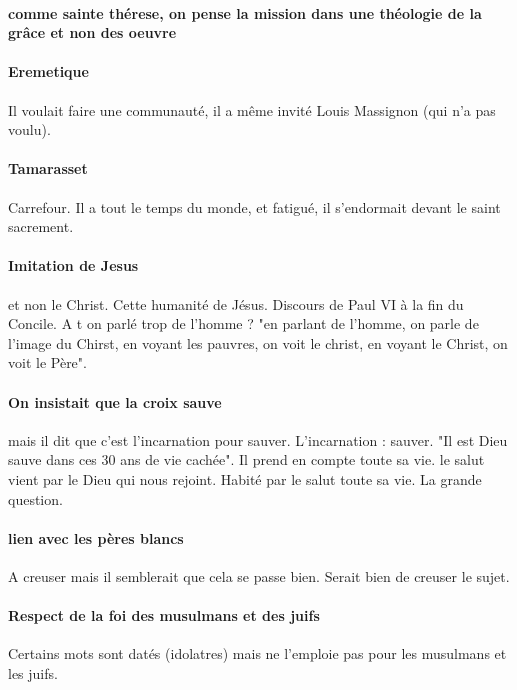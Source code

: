 \paragraph{comme sainte thérese, on pense la mission dans une théologie de la grâce et non des oeuvre}

\paragraph{Eremetique} Il voulait faire une communauté, il a même invité Louis Massignon (qui n'a pas voulu). 

\paragraph{Tamarasset} Carrefour. Il a tout le temps du monde, et fatigué, il s'endormait devant le saint sacrement.


\paragraph{Imitation de Jesus} et non le Christ. Cette humanité de Jésus.  Discours de Paul VI à la fin du Concile. A t on parlé trop de l'homme ? "en parlant de l'homme, on parle de l'image du Chirst, en voyant les pauvres, on voit le christ, en voyant le Christ, on voit le Père".

\paragraph{On insistait que la croix sauve} mais il dit que c'est l'incarnation pour sauver. L'incarnation : sauver. "Il est Dieu sauve dans ces 30 ans de vie cachée". Il prend en compte toute sa vie. le salut vient par le Dieu qui nous rejoint. 
Habité par le salut toute sa vie. La grande question. 


\paragraph{lien avec les pères blancs} A creuser mais il semblerait que cela se passe bien. Serait bien de creuser le sujet. 


\paragraph{Respect de la foi des musulmans et des juifs} Certains mots sont datés (idolatres) mais ne l'emploie pas pour les musulmans et les juifs.


